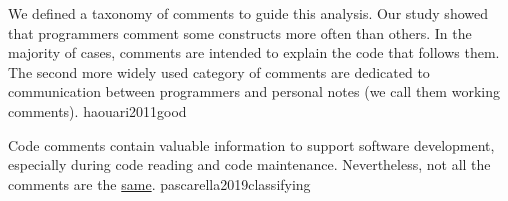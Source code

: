 \documentclass{article}
\begin{document}
  {We defined a taxonomy of comments to guide this analysis. Our study showed that programmers comment some constructs more often than others. In the majority of cases, comments are intended to explain the code that follows them. The second more widely used category of comments are dedicated to communication between programmers and personal notes (we call them working comments).}
  {haouari2011good}



  {Code comments contain valuable information to support software development, especially during code reading and code maintenance. Nevertheless, not all the comments are the \ul{same}.}
  {pascarella2019classifying}

\end{document}
